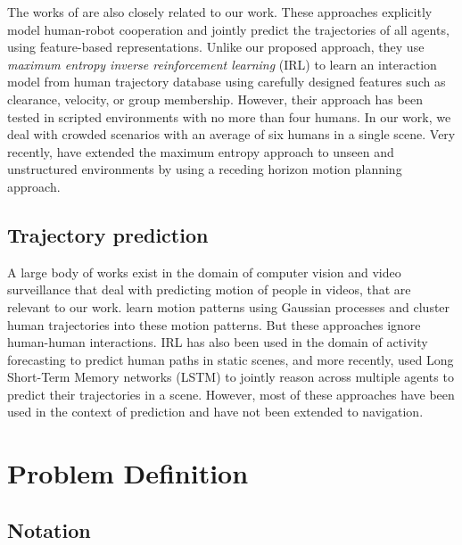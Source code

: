 %

The works of \cite{kuderer12, Kretzschmar16} are also closely related to our work. These approaches explicitly model human-robot cooperation and jointly predict the trajectories of all agents, using feature-based representations. 
Unlike our proposed approach, they use \textit{maximum entropy inverse reinforcement learning} (IRL) to learn an interaction model from human trajectory database using carefully designed features 
%
such as clearance, velocity, or group membership.
However, their approach has been tested in scripted environments with no more than four humans. In our work, we deal with crowded scenarios with an average of six humans in a single scene. Very recently, \cite{pfeiffer16} have extended the maximum entropy approach to unseen and unstructured environments by using a receding horizon motion planning approach.
%

\subsection{Trajectory prediction}
\label{sec:traj-pred}

A large body of works exist in the domain of computer vision and video surveillance that deal with predicting motion of people in videos, that are relevant to our work. \cite{kim11, joseph11} learn motion patterns using Gaussian processes and cluster human trajectories into these motion patterns. But these approaches ignore human-human interactions. IRL has also been used in the domain of activity forecasting to predict human paths in static scenes, \cite{kitani12} and more recently, \cite{alahi16} used Long Short-Term Memory networks (LSTM) to jointly reason across multiple agents to predict their trajectories in a scene. However, most of these approaches have been used in the context of prediction and have not been extended to navigation.

\section{Problem Definition}
\label{sec:problem-definition}

\subsection{Notation}
\label{sec:notation}

